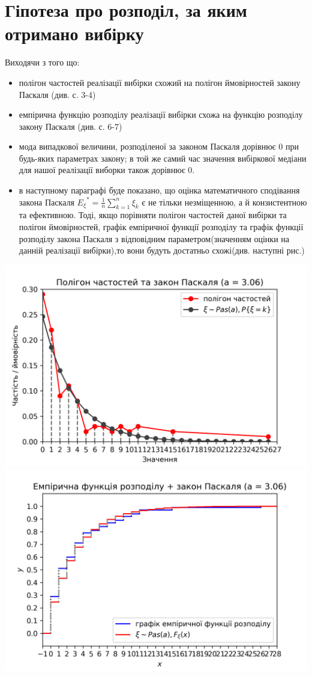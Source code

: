 \documentclass{article}
\begin{document}
\section{Гіпотеза про розподіл, за яким отримано вибірку}
Виходячи з того що:
\begin{itemize}
  \item полігон частостей реалізації вибірки схожий на полігон 
  ймовірностей закону Паскаля (див. с. 3-4)
  \item емпірична функцію розподілу реалізації вибірки схожа на
  функцію розподілу закону Паскаля (див. с. 6-7)
  \item мода випадкової величини, розподіленої за законом Паскаля
  дорівнює 0 при будь-яких параметрах закону; в той же самий час 
  значення вибіркової медіани для нашої реалізації виборки також
  дорівнює 0.
  \item в наступному параграфі буде показано, що оцінка математичного 
  сподівання закона Паскаля ${E_\xi}^* = \frac{1}{n} 
  \sum_{k=1}^{n}\xi_k$ є не тільки 
  незміщенною, а й конзистентною та ефективною. Тоді, якщо порівняти 
  полігон частостей даної вибірки та полігон ймовірностей, графік 
  емпіричної функції розподілу та графік функції розподілу закона 
  Паскаля з відповідним параметром(значенням оцінки на данній 
  реалізації вибірки),то вони будуть достатньо схожі(див. 
  наступні рис.)
\end{itemize}
\includegraphics[scale = 0.8]{hypotesis1.png}
\newline
\includegraphics[scale = 0.8]{hypotesis2.png}
\end{document}
